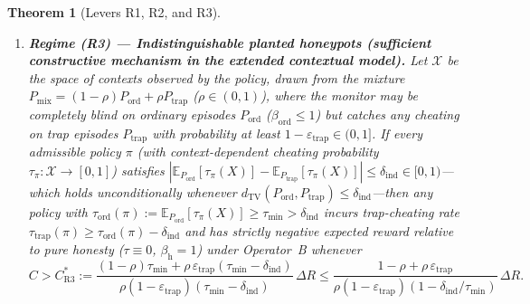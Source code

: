 \documentclass[11pt,a4paper]{article}
\newtheorem{theorem}{Theorem}
\newcommand{\E}{\mathbb{E}}
\newcommand{\dTV}{d_{\mathrm{TV}}}
\begin{document}
\begin{theorem}[Levers R1, R2, and R3]
\begin{enumerate}
  \item \textbf{Regime (R3) --- Indistinguishable planted honeypots (sufficient constructive mechanism in the extended contextual model).} Let $\mathcal{X}$ be the space of contexts observed by the policy, drawn from the mixture $P_{\mathrm{mix}} = (1-\rho)P_{\mathrm{ord}} + \rho P_{\mathrm{trap}}$ ($\rho \in (0, 1)$), where the monitor may be completely blind on ordinary episodes $P_{\mathrm{ord}}$ ($\beta_{\mathrm{ord}} \le 1$) but catches any cheating on trap episodes $P_{\mathrm{trap}}$ with probability at least $1 - \varepsilon_{\mathrm{trap}} \in (0, 1]$. If every admissible policy $\pi$ (with context-dependent cheating probability $\tau_{\pi} : \mathcal{X} \to [0, 1]$) satisfies $|\E_{P_{\mathrm{ord}}}[\tau_\pi(X)] - \E_{P_{\mathrm{trap}}}[\tau_\pi(X)]| \le \delta_{\mathrm{ind}} \in [0, 1)$---which holds unconditionally whenever $\dTV(P_{\mathrm{ord}}, P_{\mathrm{trap}}) \le \delta_{\mathrm{ind}}$---then any policy with $\tau_{\mathrm{ord}}(\pi) := \E_{P_{\mathrm{ord}}}[\tau_\pi(X)] \ge \tau_{\min} > \delta_{\mathrm{ind}}$ incurs trap-cheating rate $\tau_{\mathrm{trap}}(\pi) \ge \tau_{\mathrm{ord}}(\pi) - \delta_{\mathrm{ind}}$ and has strictly negative expected reward relative to pure honesty ($\tau \equiv 0$, $\beta_{\mathrm{h}} = 1$) under Operator~B whenever
  \begin{equation}\label{eq:R3}
    C > C_{\mathrm{R3}}^*
    := \frac{(1-\rho)\tau_{\min} + \rho\,\varepsilon_{\mathrm{trap}}(\tau_{\min} - \delta_{\mathrm{ind}})}{\rho(1 - \varepsilon_{\mathrm{trap}})(\tau_{\min} - \delta_{\mathrm{ind}})}\,\Delta R
    \le \frac{1 - \rho + \rho\,\varepsilon_{\mathrm{trap}}}{\rho(1 - \varepsilon_{\mathrm{trap}})(1 - \delta_{\mathrm{ind}}/\tau_{\min})}\,\Delta R.
  \end{equation}
\end{enumerate}
\end{theorem}
\end{document}
